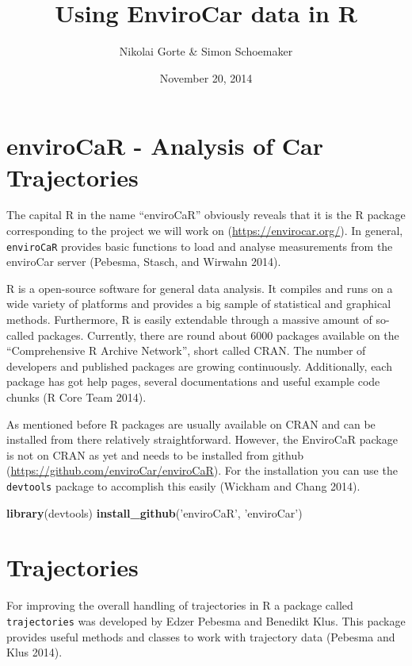 \documentclass[]{article}
\title{Using EnviroCar data in R}
\author{Nikolai Gorte \& Simon Schoemaker}
\date{November 20, 2014}
\newenvironment{Shaded}{\begin{snugshade}}{\end{snugshade}}
\newcommand{\KeywordTok}[1]{\textcolor[rgb]{0.13,0.29,0.53}{\textbf{{#1}}}}
\newcommand{\StringTok}[1]{\textcolor[rgb]{0.31,0.60,0.02}{{#1}}}
\newcommand{\NormalTok}[1]{{#1}}
\begin{document}
\maketitle


\section{enviroCaR - Analysis of Car
Trajectories}\label{envirocar---analysis-of-car-trajectories}

The capital R in the name ``enviroCaR'' obviously reveals that it is the
R package corresponding to the project we will work on
(\url{https://envirocar.org/}). In general, \texttt{enviroCaR} provides
basic functions to load and analyse measurements from the enviroCar
server (Pebesma, Stasch, and Wirwahn 2014).

R is a open-source software for general data analysis. It compiles and
runs on a wide variety of platforms and provides a big sample of
statistical and graphical methods. Furthermore, R is easily extendable
through a massive amount of so-called packages. Currently, there are
round about 6000 packages available on the ``Comprehensive R Archive
Network'', short called CRAN. The number of developers and published
packages are growing continuously. Additionally, each package has got
help pages, several documentations and useful example code chunks (R
Core Team 2014).

As mentioned before R packages are usually available on CRAN and can be
installed from there relatively straightforward. However, the EnviroCaR
package is not on CRAN as yet and needs to be installed from github
(\url{https://github.com/enviroCar/enviroCaR}). For the installation you
can use the \texttt{devtools} package to accomplish this easily (Wickham
and Chang 2014).

\begin{Shaded}
\begin{Highlighting}[]
\KeywordTok{library}\NormalTok{(devtools)}
\KeywordTok{install_github}\NormalTok{(}\StringTok{'enviroCaR'}\NormalTok{, }\StringTok{'enviroCar'}\NormalTok{)}
\end{Highlighting}
\end{Shaded}

\section{Trajectories}\label{trajectories}

For improving the overall handling of trajectories in R a package called
\texttt{trajectories} was developed by Edzer Pebesma and Benedikt Klus.
This package provides useful methods and classes to work with trajectory
data (Pebesma and Klus 2014).
\end{document}
